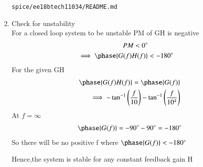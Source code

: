 \begin{enumerate}[label=\arabic*.,ref=\theenumi]
\begin{lstlisting}
spice/ee18btech11034/README.md
\end{lstlisting}
\item Check for unstability\\
\solution For a closed loop system to be unstable PM of GH is negative\\
\begin{align}
PM < 0\degree\\
\implies \phase{G(f)H(f)} &< -180\degree
\end{align}
For the given GH
\begin{align}
\phase{G(f)H(f)} = \phase{G(f)}
\\
\implies -\tan^{-1}\brak{\frac{f}{10}} -\tan^{-1}\brak{\frac{f}{10^{4}}}
\end{align}
At $f = \infty$
\begin{align}
\phase{G(f)} = -90\degree -90\degree = -180\degree
\end{align}
So there will be no positive f where $\phase{G(f)} < -180\degree$

Hence,the system is stable for any constant feedback gain H
\end{enumerate}
